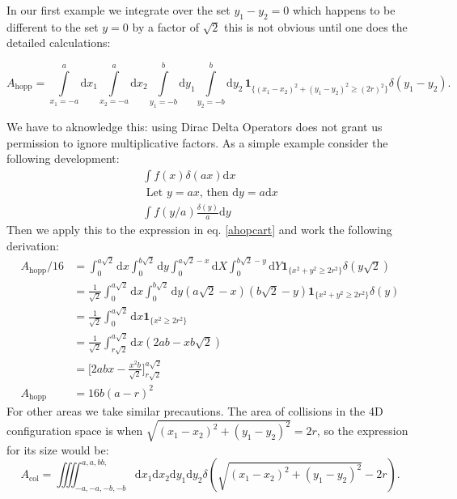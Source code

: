 \documentclass[letterpaper,10pt, jcp, aps]{revtex4-1}
\newcommand{\rd}{\!\mathrm{d}}
\newcommand{\indicator}[1]{\mathbf{1}_{ \{   #1 \} } }
\begin{document}
In our first example
we integrate over the set $y_1-y_2=0$ which happens to be different to the set
$y=0$ by a factor of $\sqrt{2}$ this is not obvious until one does the detailed calculations:
\begin{widetext}\label{ahopcart}
\begin{equation}
 A_\text{hopp} = \int\limits_{x_1 = -a}^a \rd x_1 \int\limits_{x_2 = -a}^a \rd x_2 
\int\limits_{y_1 = -b}^b \rd y_1 \int\limits_{y_2 = -b}^b \rd y_2 \, \indicator{ (x_1-x_2)^2 + (y_1-y_2)^2 \ge (2r)^2 } \delta(y_1-y_2).
\end{equation}
\end{widetext}
We have to aknowledge this: using Dirac Delta Operators does not grant us permission
to ignore multiplicative factors. As a simple example consider the following
development:
  \begin{align*}
    \int f(x) \delta(a x) \rd x \\
    \text{ Let } y=ax \text{, then } \rd y = a \rd x\\
    \int f(y/a) \frac{\delta(y)}{a} \rd y 
  \end{align*}
  Then we apply this to the expression in eq. \ref{ahopcart} and work the following
  derivation:
  \begin{align}
    A_\text{hopp}/16 & = \int_0^{a\sqrt{2}} \rd x  \int_0^{b \sqrt{2}} \rd y
    \int_0^{a\sqrt{2}-x} \rd X  \int_0^{b \sqrt{2}-y} \rd Y
    \indicator{x^2+y^2 \geq 2 r^2} \delta (y\sqrt{2})\\
    &= \frac{1}{\sqrt{2}} \int_0^{a\sqrt{2}} \rd x  \int_0^{b \sqrt{2}} \rd y
    (a\sqrt{2}-x)(b\sqrt{2}-y)
    \indicator{x^2+y^2 \geq 2 r^2} \delta (y)\\
    &=\frac{1}{\sqrt{2}} \int_0^{a\sqrt{2}} \rd x
    \indicator{x^2\geq 2 r^2} \\
    &=\frac{1}{\sqrt{2}} \int_{r\sqrt{2}}^{a\sqrt{2}} \rd x
    (2ab-xb\sqrt{2})\\
    &=\biggl[2abx-\frac{x^2b}{\sqrt{2}} \biggr]_{r\sqrt{2}}^{a\sqrt{2}}\\
      A_\text{hopp}&=16b(a-r)^2
  \end{align}  
  For other areas we take similar precautions. The area of collisions in
  the 4D configuration space is when $\sqrt{(x_1-x_2)^2+(y_1-y_2)^2}=2r$, so the
  expression for its size would be:
  \begin{equation}
    A_\text{col}=\iiiint _{-a,-a,-b,-b}^{a,a,bb,}
    \rd x_1 \rd x_2 \rd y_1 \rd y_2 
    \delta (\sqrt{(x_1-x_2)^2+(y_1-y_2)^2}-2r).
    \end{equation}
\end{document}
